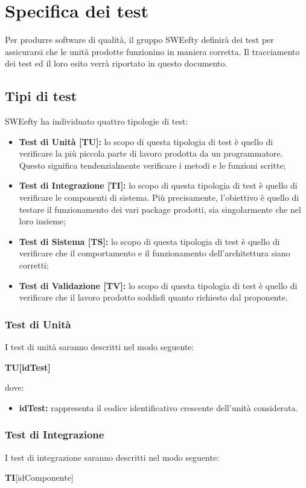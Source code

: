 \section{Specifica dei test}
Per produrre software di qualità, il gruppo SWEefty definirà dei test per assicurarsi che le unità prodotte funzionino in maniera corretta. Il tracciamento dei test ed il loro esito verrà riportato in questo documento.
	\subsection{Tipi di test}
	SWEefty ha individuato quattro tipologie di test:
	\begin{itemize}
		\item {\textbf{Test di Unità [TU]:} lo scopo di questa tipologia di test è quello di verificare la più piccola parte di lavoro prodotta da un programmatore. Questo significa tendenzialmente verificare i metodi e le funzioni scritte; }
		\item {\textbf{Test di Integrazione [TI]:} lo scopo di questa tipologia di test è quello di verificare le componenti di sistema. Più	precisamente, l’obiettivo è quello di testare il funzionamento dei vari package prodotti, sia singolarmente che nel loro insieme; }
		\item {\textbf{Test di Sistema [TS]:} lo scopo di questa tipologia di test è quello di verificare che il comportamento e il funzionamento dell’architettura siano corretti;}
		\item {\textbf{Test di Validazione [TV]:} lo scopo di questa tipologia di test è quello di verificare che il lavoro prodotto soddisfi quanto richiesto dal proponente. }
	\end{itemize} 
		
	\subsubsection{Test di Unità}
	I test di unità saranno descritti nel modo seguente:

	\textbf{TU[idTest]}
	
	dove:
	\begin{itemize}
		\item \textbf{idTest:} rappresenta il codice identificativo crescente dell’unità considerata.
	\end{itemize}
	
	\subsubsection{Test di Integrazione}
	I test di integrazione saranno descritti nel modo seguente: \Spazio
	\centerline{\textbf{TI}[idComponente]}
	
